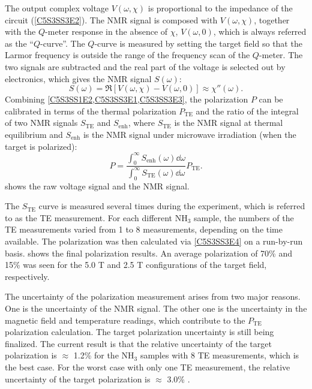 The output complex voltage $V(\omega,\chi)$ is proportional to the impedance of the circuit (\cref{C5S3SS3E2}). The NMR signal is composed with $V(\omega,\chi)$, together with the $Q$-meter response in the absence of $\chi$, $V(\omega,0)$, which is always referred as the ``$Q$-curve''. The $Q$-curve is measured by setting the target field so that the Larmor frequency is outside the range of the frequency scan of the $Q$-meter. The two signals are subtracted and the real part of the voltage is selected out by electronics, which gives the NMR signal $S(\omega)$:
\begin{equation} \label{C5S3SS3E3}
S(\omega) = \Re[V(\omega,\chi)-V(\omega,0)]\approx\chi''(\omega).
\end{equation}
Combining \cref{C5S3SS1E2,C5S3SS3E1,C5S3SS3E3}, the polarization $P$ can be calibrated in terms of the thermal polarization $P_{\mathrm{TE}}$ and the ratio of the integral of two NMR signals $S_{\mathrm{TE}}$ and $S_{\mathrm{enh}}$, where $S_{\mathrm{TE}}$ is the NMR signal at thermal equilibrium and $S_{\mathrm{enh}}$ is the NMR signal under microwave irradiation (when the target is polarized):
\begin{equation} \label{C5S3SS3E4}
P = \frac{\int_0^\infty S_{\mathrm{enh}}(\omega)\dd{\omega}}{\int_0^\infty S_{\mathrm{TE}}(\omega)\dd{\omega}}P_{\mathrm{TE}}.
\end{equation}
 shows the raw voltage signal and the NMR signal.

The $S_{\mathrm{TE}}$ curve is measured several times during the experiment, which is referred to as the TE measurement. For each different NH${}_3$ sample, the numbers of the TE measurements varied from 1 to 8 measurements, depending on the time available. The polarization was then calculated via \cref{C5S3SS3E4} on a run-by-run basis.  shows the final polarization results. An average polarization of 70\% and 15\% was seen for the 5.0 T and 2.5 T configurations of the target field, respectively.

The uncertainty of the polarization measurement arises from two major reasons. One is the uncertainty of the NMR signal. The other one is the uncertainty in the magnetic field and temperature readings, which contribute to the $P_{\mathrm{TE}}$ polarization calculation. The target polarization uncertainty is still being finalized. The current result is that the relative uncertainty of the target polarization is $\approx$ 1.2\% for the NH${}_3$ samples with 8 TE measurements, which is the best case. For the worst case with only one TE measurement, the relative uncertainty of the target polarization is $\approx$ 3.0\% \cite{Badman2013}.

